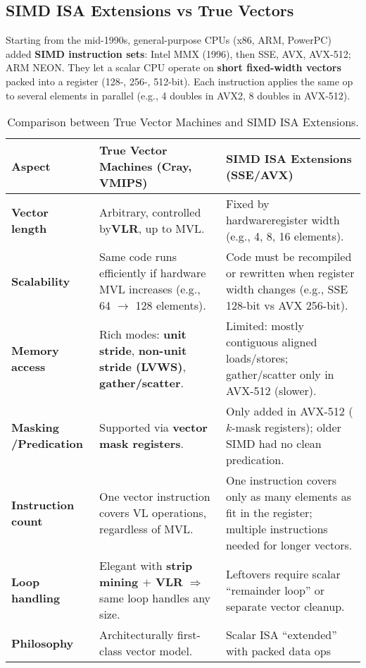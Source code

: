 \subsection{SIMD ISA Extensions vs True Vectors}

Starting from the mid-1990s, general-purpose CPUs (x86, ARM, PowerPC) added \textbf{SIMD instruction sets}: Intel MMX (1996), then SSE, AVX, AVX-512; ARM NEON. They let a scalar CPU operate on \textbf{short fixed-width vectors} packed into a register (128-, 256-, 512-bit). Each instruction applies the same op to several elements in parallel (e.g., 4 doubles in AVX2, 8 doubles in AVX-512).

\highspace
\begin{table}[!htp]
    \centering
    \begin{tabular}{@{} p{8em} | p{12em} | p{12em} @{}}
    \toprule
    \textbf{Aspect} & \textbf{True Vector Machines (Cray, VMIPS)} & \textbf{SIMD ISA Extensions (SSE/AVX)} \\
    \midrule
    \textbf{Vector length} & Arbitrary, controlled by\vfill \textbf{VLR}, up to MVL. & Fixed by hardware\vfill register width (e.g., 4, 8, 16 elements). \\ [.5em]

    \textbf{Scalability} & Same code runs efficiently if hardware MVL increases (e.g., 64 $\rightarrow$ 128 elements). & Code must be recompiled or rewritten when register width changes (e.g., SSE 128-bit vs AVX 256-bit). \\ [.5em]

    \textbf{Memory access} & Rich modes: \textbf{unit stride}, \textbf{non-unit stride (LVWS)}, \textbf{gather/scatter}. & Limited: mostly contiguous aligned loads/stores; gather/scatter only in AVX-512 (slower). \\ [.5em]

    \textbf{Masking /\vfill\break Predication} & Supported via \textbf{vector mask registers}. & Only added in AVX-512 ($k$-mask registers); older SIMD had no clean predication. \\ [.5em]

    \textbf{Instruction count} & One vector instruction covers VL operations, regardless of MVL. & One instruction covers only as many elements as fit in the register; multiple instructions needed for longer vectors. \\ [.5em]

    \textbf{Loop handling} & Elegant with \textbf{strip mining $+$ VLR} $\Rightarrow$ same loop handles any size. & Leftovers require scalar ``remainder loop'' or separate vector cleanup. \\ [.5em]

    \textbf{Philosophy} & Architecturally first-class vector model. & Scalar ISA ``extended'' with packed data ops \\
    \bottomrule
    \end{tabular}
    \caption{Comparison between True Vector Machines and SIMD ISA Extensions.}
\end{table}

